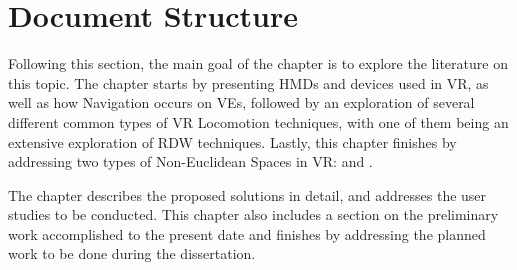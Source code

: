 \section{Document Structure}
\label{sec:doc-struct}


Following this section, the main goal of the  chapter is to explore the literature on this topic. The chapter starts by presenting
\glspl{HMD} and devices used in \gls{VR}, as well as how Navigation occurs on \glspl{VE}, followed by an exploration of several different 
common types of \gls{VR} Locomotion techniques, with one of them being an extensive exploration of \gls{RDW} techniques. Lastly, this chapter 
finishes by addressing two types of Non-Euclidean Spaces in \gls{VR}:  and . 

The  chapter describes the proposed solutions in detail, and addresses the user studies to be conducted. 
This chapter also includes a section on the preliminary work accomplished to the present date and finishes by addressing the planned work to 
be done during the dissertation.

